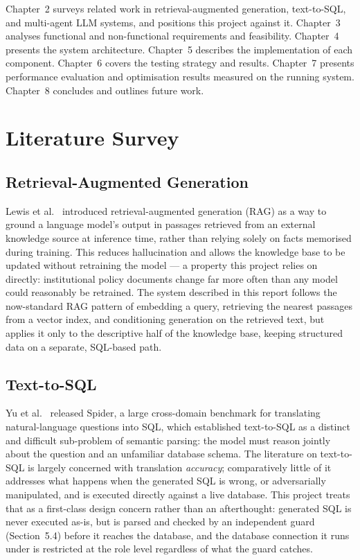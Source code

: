\documentclass[11pt,a4paper,oneside]{report}
\begin{document}
Chapter~2 surveys related work in retrieval-augmented generation, text-to-SQL,
and multi-agent LLM systems, and positions this project against it.
Chapter~3 analyses functional and non-functional requirements and feasibility.
Chapter~4 presents the system architecture. Chapter~5 describes the
implementation of each component. Chapter~6 covers the testing strategy and
results. Chapter~7 presents performance evaluation and optimisation results
measured on the running system. Chapter~8 concludes and outlines future work.

\chapter{Literature Survey}

\section{Retrieval-Augmented Generation}

Lewis et al.~\cite{lewis2020rag} introduced retrieval-augmented generation
(RAG) as a way to ground a language model's output in passages retrieved from
an external knowledge source at inference time, rather than relying solely on
facts memorised during training. This reduces hallucination and allows the
knowledge base to be updated without retraining the model --- a property this
project relies on directly: institutional policy documents change far more
often than any model could reasonably be retrained. The system described in
this report follows the now-standard RAG pattern of embedding a query,
retrieving the nearest passages from a vector index, and conditioning
generation on the retrieved text, but applies it only to the descriptive half
of the knowledge base, keeping structured data on a separate, SQL-based path.

\section{Text-to-SQL}

Yu et al.~\cite{yu2018spider} released Spider, a large cross-domain benchmark
for translating natural-language questions into SQL, which established
text-to-SQL as a distinct and difficult sub-problem of semantic parsing: the
model must reason jointly about the question and an unfamiliar database
schema. The literature on text-to-SQL is largely concerned with translation
\emph{accuracy}; comparatively little of it addresses what happens when the
generated SQL is wrong, or adversarially manipulated, and is executed
directly against a live database. This project treats that as a first-class
design concern rather than an afterthought: generated SQL is never executed
as-is, but is parsed and checked by an independent guard (Section~5.4) before
it reaches the database, and the database connection it runs under is
restricted at the role level regardless of what the guard catches.
\end{document}
